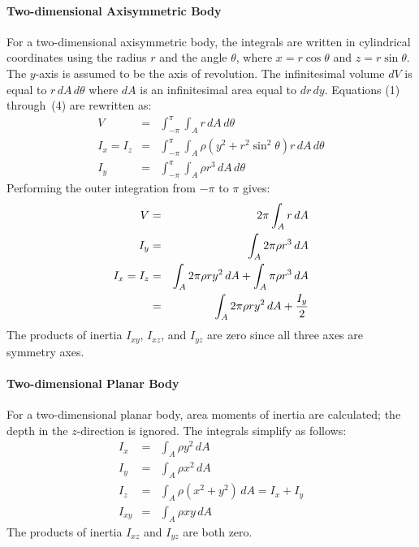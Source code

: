 \paragraph{Two-dimensional Axisymmetric Body}
For a two-dimensional axisymmetric body, the integrals are written in
cylindrical coordinates using the radius $r$ and the angle $\theta$,
where $x = r\cos\theta$ and $z = r\sin\theta$.  The $y$-axis is
assumed to be the axis of revolution.  The infinitesimal volume $dV$
is equal to $r\,dA\,d\theta$ where $dA$ is an infinitesimal area
equal to $dr\,dy$. Equations (1) through~(4) are rewritten as:
\begin{eqnarray}
V   &=& \int_{-\pi}^\pi\int_A r\,dA\,d\theta   \\
I_x = I_z &=&\int_{-\pi}^\pi\int_A
              \rho\left(y^2 + r^2\sin^2\theta\right)r\,dA\,d\theta\\
I_y &=& \int_{-\pi}^\pi\int_A \rho r^3\,dA\,d\theta
\end{eqnarray}
Performing the outer integration from $-\pi$ to $\pi$ gives:
\begin{eqnarray}
V   &=& 2\pi\int_A r\,dA   \\
I_y &=& \int_A 2\pi\rho r^3\,dA   \\
I_x = I_z &=& \int_A 2\pi\rho r y^2\,dA + \int_A \pi\rho r^3\,dA\\
    &=& \int_A 2\pi\rho r y^2\,dA + {I_y\over2}
\end{eqnarray}
The products of inertia $I_{xy}$, $I_{xz}$, and $I_{yz}$ are zero since
all three axes are symmetry axes.

\paragraph{Two-dimensional Planar Body}
For a two-dimensional planar body, area moments of inertia are
calculated; the depth in the $z$-direction is ignored. The integrals
simplify as follows:
\begin{eqnarray}
 I_x    &=& \int_A \rho y^2\,dA                   \\
 I_y    &=& \int_A \rho x^2\,dA                   \\
 I_z    &=& \int_A \rho\left(x^2 + y^2\right)\,dA = I_x + I_y \\
 I_{xy} &=& \int_A \rho xy\,dA
\end{eqnarray}
The products of inertia $I_{xz}$ and $I_{yz}$ are both zero.

